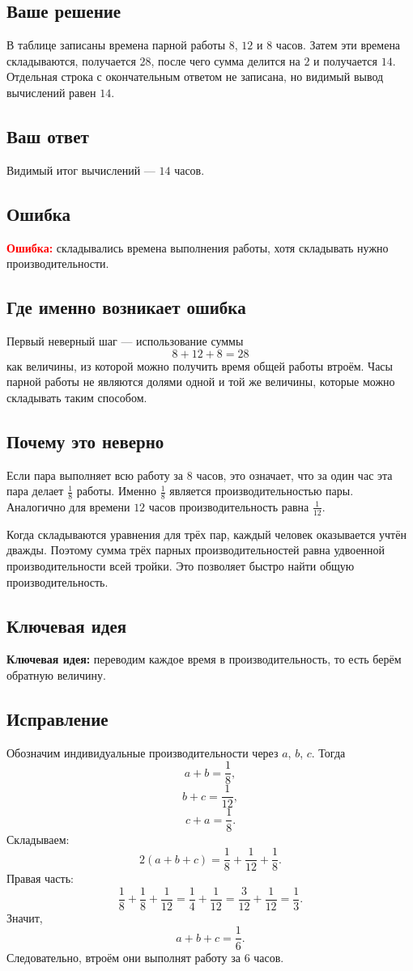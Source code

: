 \documentclass[12pt,a4paper]{article}
\newcommand{\err}{\textcolor{red}{\textbf{Ошибка:}}}
\newcommand{\idea}{\textcolor{blue!60!black}{\textbf{Ключевая идея:}}}
\begin{document}
\subsection*{Ваше решение}
В таблице записаны времена парной работы $8$, $12$ и $8$ часов. Затем эти времена складываются, получается $28$, после чего сумма делится на $2$ и получается $14$. Отдельная строка с окончательным ответом не записана, но видимый вывод вычислений равен $14$.

\subsection*{Ваш ответ}
Видимый итог вычислений --- $14$ часов.

\subsection*{Ошибка}
\err{} складывались времена выполнения работы, хотя складывать нужно производительности.

\subsection*{Где именно возникает ошибка}
Первый неверный шаг --- использование суммы
\[
8+12+8=28
\]
как величины, из которой можно получить время общей работы втроём. Часы парной работы не являются долями одной и той же величины, которые можно складывать таким способом.

\subsection*{Почему это неверно}
Если пара выполняет всю работу за $8$ часов, это означает, что за один час эта пара делает $\frac18$ работы. Именно $\frac18$ является производительностью пары. Аналогично для времени $12$ часов производительность равна $\frac1{12}$.

Когда складываются уравнения для трёх пар, каждый человек оказывается учтён дважды. Поэтому сумма трёх парных производительностей равна удвоенной производительности всей тройки. Это позволяет быстро найти общую производительность.

\subsection*{Ключевая идея}
\idea{} переводим каждое время в производительность, то есть берём обратную величину.

\subsection*{Исправление}
Обозначим индивидуальные производительности через $a$, $b$, $c$. Тогда
\[
a+b=\frac18,
\]
\[
b+c=\frac1{12},
\]
\[
c+a=\frac18.
\]
Складываем:
\[
2(a+b+c)=\frac18+\frac1{12}+\frac18.
\]
Правая часть:
\[
\frac18+\frac18+\frac1{12}=\frac14+\frac1{12}=\frac{3}{12}+\frac1{12}=\frac13.
\]
Значит,
\[
a+b+c=\frac16.
\]
Следовательно, втроём они выполнят работу за $6$ часов.
\end{document}
